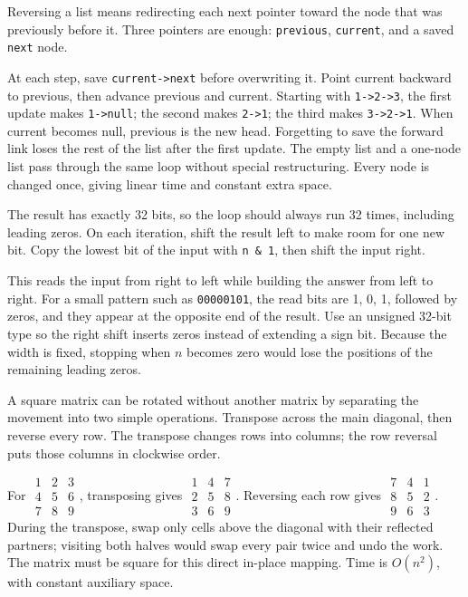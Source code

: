 \expandafter\def\csname sourcewalkthrough@53\endcsname{%
Reversing a list means redirecting each next pointer toward the node that was
previously before it. Three pointers are enough: \texttt{previous},
\texttt{current}, and a saved \texttt{next} node.

At each step, save \texttt{current->next} before overwriting it. Point current
backward to previous, then advance previous and current. Starting with
\texttt{1->2->3}, the first update makes \texttt{1->null}; the second makes
\texttt{2->1}; the third makes \texttt{3->2->1}. When current becomes null,
previous is the new head. Forgetting to save the forward link loses the rest
of the list after the first update. The empty list and a one-node list pass
through the same loop without special restructuring. Every node is changed
once, giving linear time and constant extra space.}

\expandafter\def\csname sourcewalkthrough@54\endcsname{%
The result has exactly 32 bits, so the loop should always run 32 times,
including leading zeros. On each iteration, shift the result left to make room
for one new bit. Copy the lowest bit of the input with \texttt{n \& 1}, then
shift the input right.

\enlargethispage{2\baselineskip}
This reads the input from right to left while building the answer from left to
right. For a small pattern such as \texttt{00000101}, the read bits are
1, 0, 1, followed by zeros, and they appear at the opposite end of the result.
Use an unsigned 32-bit type so the right shift inserts zeros instead of
extending a sign bit. Because the width is fixed, stopping when \(n\) becomes
zero would lose the positions of the remaining leading zeros.}

\expandafter\def\csname sourcewalkthrough@55\endcsname{%
A square matrix can be rotated without another matrix by separating the
movement into two simple operations. Transpose across the main diagonal, then
reverse every row. The transpose changes rows into columns; the row reversal
puts those columns in clockwise order.

For
\(\begin{smallmatrix}1&2&3\\4&5&6\\7&8&9\end{smallmatrix}\), transposing gives
\(\begin{smallmatrix}1&4&7\\2&5&8\\3&6&9\end{smallmatrix}\). Reversing each
row gives
\(\begin{smallmatrix}7&4&1\\8&5&2\\9&6&3\end{smallmatrix}\). During the
transpose, swap only cells above the diagonal with their reflected partners;
visiting both halves would swap every pair twice and undo the work. The matrix
must be square for this direct in-place mapping. Time is \(O(n^2)\), with
constant auxiliary space.}

